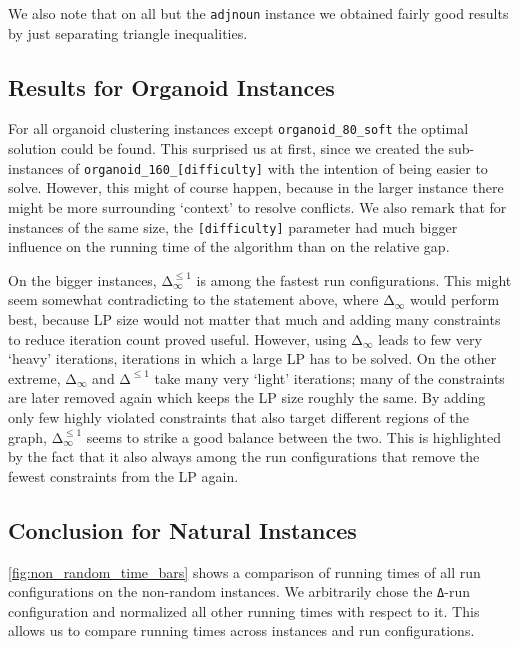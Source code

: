 We also note that on all but the \texttt{adjnoun} instance we obtained fairly good results by just separating triangle inequalities.

\subsection{Results for Organoid Instances}
For all organoid clustering instances except \texttt{organoid\_80\_soft} the optimal solution could be found.
This surprised us at first, since we created the sub-instances of \texttt{organoid\_160\_[difficulty]} with the intention of being easier to solve.
However, this might of course happen, because in the larger instance there might be more surrounding ‘context’ to resolve conflicts.
We also remark that for instances of the same size, the \texttt{[difficulty]} parameter had much bigger influence on the running time of the algorithm than on the relative gap.

On the bigger instances, $\texttt{Δ}_{\infty}^{\leq 1}$ is among the fastest run configurations.
This might seem somewhat contradicting to the statement above, where $\texttt{Δ}_{\infty}$ would perform best,
because LP size would not matter that much and adding many constraints to reduce iteration count proved useful.
However, using $\texttt{Δ}_{\infty}$ leads to few very ‘heavy’ iterations, \ie iterations in which a large LP has to be solved.
On the other extreme, $\texttt{Δ}_{\infty}$ and $\texttt{Δ}^{\leq 1}$ take many very ‘light’ iterations; many of the constraints are later removed again which keeps the LP size roughly the same.
By adding only few highly violated constraints that also target different regions of the graph, $\texttt{Δ}_{\infty}^{\leq 1}$ seems to strike a good balance between the two.
This is highlighted by the fact that it also always among the run configurations that remove the fewest constraints from the LP again.

\subsection{Conclusion for Natural Instances}
\cref{fig:non_random_time_bars} shows a comparison of running times of all run configurations on the non-random instances.
We arbitrarily chose the \texttt{Δ}-run configuration and normalized all other running times with respect to it.
This allows us to compare running times across instances and run configurations.

